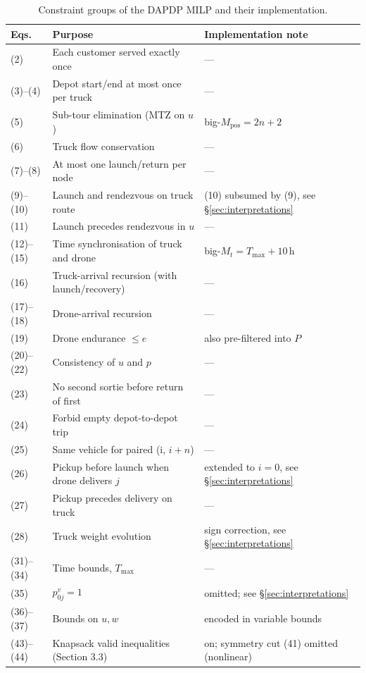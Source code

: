 \documentclass[11pt,a4paper]{article}
\newcommand{\dapdp}{\textsc{DAPDP}}
\begin{document}
\begin{table}[t]
\centering
\caption{Constraint groups of the \dapdp{} MILP and their implementation.}
\label{tab:constraints}
\small
\begin{tabular}{@{}lll@{}}
\toprule
Eqs.        & Purpose                                          & Implementation note \\
\midrule
(2)         & Each customer served exactly once                & --- \\
(3)--(4)    & Depot start/end at most once per truck           & --- \\
(5)         & Sub-tour elimination (MTZ on $u$)                & big-$M_{\text{pos}} = 2n+2$ \\
(6)         & Truck flow conservation                          & --- \\
(7)--(8)    & At most one launch/return per node               & --- \\
(9)--(10)   & Launch and rendezvous on truck route             & (10) subsumed by (9), see \S\ref{sec:interpretations} \\
(11)        & Launch precedes rendezvous in $u$                & --- \\
(12)--(15)  & Time synchronisation of truck and drone          & big-$M_t = T_{\max}+10$\,h \\
(16)        & Truck-arrival recursion (with launch/recovery)   & --- \\
(17)--(18)  & Drone-arrival recursion                          & --- \\
(19)        & Drone endurance $\le e$                          & also pre-filtered into $P$ \\
(20)--(22)  & Consistency of $u$ and $p$                       & --- \\
(23)        & No second sortie before return of first          & --- \\
(24)        & Forbid empty depot-to-depot trip                 & --- \\
(25)        & Same vehicle for paired (i, $i+n$)               & --- \\
(26)        & Pickup before launch when drone delivers $j$     & extended to $i{=}0$, see \S\ref{sec:interpretations} \\
(27)        & Pickup precedes delivery on truck                & --- \\
(28)        & Truck weight evolution                           & sign correction, see \S\ref{sec:interpretations} \\
(31)--(34)  & Time bounds, $T_{\max}$                          & --- \\
(35)        & $p^{v}_{0j}=1$                                   & omitted; see \S\ref{sec:interpretations} \\
(36)--(37)  & Bounds on $u, w$                                 & encoded in variable bounds \\
(43)--(44)  & Knapsack valid inequalities (Section 3.3)        & on; symmetry cut (41) omitted (nonlinear) \\
\bottomrule
\end{tabular}
\end{table}
\end{document}
